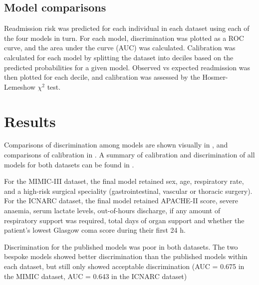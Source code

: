 \documentclass[onecolumn]{article}
\begin{document}
\subsection{Model comparisons}

Readmission risk was predicted for each individual in each dataset using each of the four models in turn. For each model, discrimination was plotted as a ROC curve, and the area under the curve (AUC) was calculated. Calibration was calculated for each model by splitting the dataset into deciles based on the predicted probabilities for a given model. Observed vs expected readmission was then plotted for each decile, and calibration was assessed by the Hosmer-Lemeshow $ \chi^{2} $ test.

\section{Results}

Comparisons of discrimination among models are shown visually in , and comparisons of calibration in . A summary of calibration and discrimination of all models for both datasets can be found in .



For the MIMIC-III dataset, the final model retained sex, age, respiratory rate, and a high-risk surgical speciality (gastrointestinal, vascular or thoracic surgery). For the ICNARC dataset, the final model retained APACHE-II score, severe anaemia, serum lactate levels, out-of-hours discharge, if any amount of respiratory support was required, total days of organ support and whether the patient's lowest Glasgow coma score during their first 24 h.

Discrimination for the published models was poor in both datasets. The two bespoke models showed better discrimination than the published models within each dataset, but still only showed acceptable discrimination (AUC = 0.675 in the MIMIC dataset, AUC = 0.643 in the ICNARC dataset)
\end{document}

